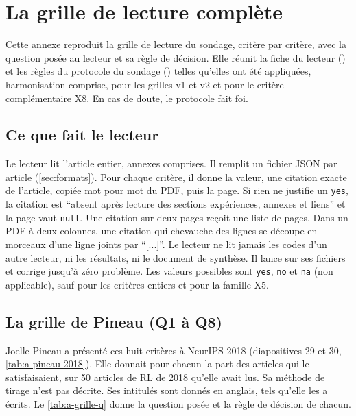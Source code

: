 \chapter{La grille de lecture complète}
\label{chap:A-grille}

Cette annexe reproduit la grille de lecture du sondage, critère par critère, avec la question posée
au lecteur et sa règle de décision. Elle réunit la fiche du lecteur () et les
règles du protocole du sondage () telles qu'elles ont été appliquées,
harmonisation comprise, pour les grilles v1 et v2 et pour le critère complémentaire X8. En cas de
doute, le protocole fait foi.

\section{Ce que fait le lecteur}
\label{sec:a-lecteur}

Le lecteur lit l'article entier, annexes comprises. Il remplit un fichier JSON par article
(\cref{sec:formats}). Pour chaque critère, il donne la valeur, une citation exacte de l'article,
copiée mot pour mot du PDF, puis la page. Si rien ne justifie un \texttt{yes}, la citation est
\enquote{absent après lecture des sections expériences, annexes et liens} et la page vaut
\texttt{null}. Une citation sur deux pages reçoit une liste de pages. Dans un PDF à deux colonnes, une
citation qui chevauche des lignes se découpe en morceaux d'une ligne joints par \enquote{[...]}. Le
lecteur ne lit jamais les codes d'un autre lecteur, ni les résultats, ni le document de synthèse. Il
lance  sur ses fichiers et corrige jusqu'à zéro problème. Les valeurs
possibles sont \texttt{yes}, \texttt{no} et \texttt{na} (non applicable), sauf pour les critères
entiers et pour la famille X5.

\section{La grille de Pineau (Q1 à Q8)}
\label{sec:a-pineau}

Joelle Pineau a présenté ces huit critères à NeurIPS 2018 (diapositives 29 et 30, \cref{tab:a-pineau-2018}). Elle donnait pour
chacun la part des articles qui le satisfaisaient, sur 50 articles de RL de 2018 qu'elle avait lus. Sa méthode de tirage n'est
pas décrite. Ses intitulés sont donnés en anglais, tels qu'elle les a écrits. Le \cref{tab:a-grille-q}
donne la question posée et la règle de décision de chacun.

